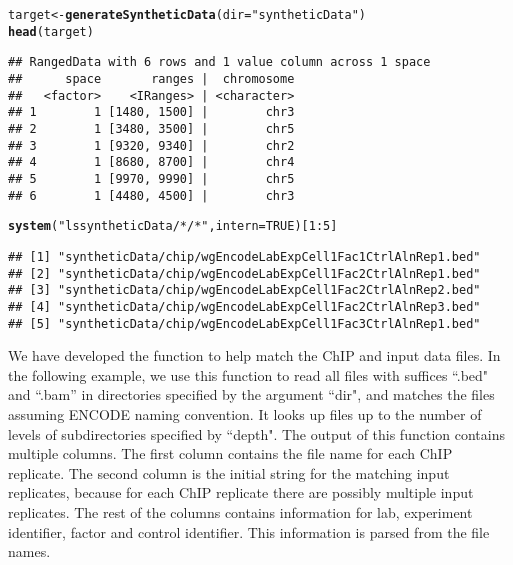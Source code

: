 \documentclass[a4paper,10pt]{article}\usepackage[]{graphicx}\usepackage[]{color}
\makeatletter
\newcommand{\hlnum}[1]{\textcolor[rgb]{0.686,0.059,0.569}{#1}}%
\newcommand{\hlstr}[1]{\textcolor[rgb]{0.192,0.494,0.8}{#1}}%
\newcommand{\hlopt}[1]{\textcolor[rgb]{0,0,0}{#1}}%
\newcommand{\hlstd}[1]{\textcolor[rgb]{0.345,0.345,0.345}{#1}}%
\newcommand{\hlkwb}[1]{\textcolor[rgb]{0.69,0.353,0.396}{#1}}%
\newcommand{\hlkwc}[1]{\textcolor[rgb]{0.333,0.667,0.333}{#1}}%
\newcommand{\hlkwd}[1]{\textcolor[rgb]{0.737,0.353,0.396}{\textbf{#1}}}%
\newenvironment{kframe}{%
 \def\at@end@of@kframe{}%
 \ifinner\ifhmode%
  \def\at@end@of@kframe{\end{minipage}}%
  \begin{minipage}{\columnwidth}%
 \fi\fi%
 \def\FrameCommand##1{\hskip\@totalleftmargin \hskip-\fboxsep
 \colorbox{shadecolor}{##1}\hskip-\fboxsep
     \hskip-\linewidth \hskip-\@totalleftmargin \hskip\columnwidth}%
 \MakeFramed {\advance\hsize-\width
   \@totalleftmargin\z@ \linewidth\hsize
   \@setminipage}}%
 {\par\unskip\endMakeFramed%
 \at@end@of@kframe}
\newenvironment{knitrout}{}{} %
\makeatother
\begin{document}
\begin{knitrout}
\color{fgcolor}\begin{kframe}
\begin{alltt}
\hlstd{target} \hlkwb{<-} \hlkwd{generateSyntheticData}\hlstd{(}\hlkwc{dir} \hlstd{=} \hlstr{"syntheticData"}\hlstd{)}
\hlkwd{head}\hlstd{(target)}
\end{alltt}
\begin{verbatim}
## RangedData with 6 rows and 1 value column across 1 space
##      space       ranges |  chromosome
##   <factor>    <IRanges> | <character>
## 1        1 [1480, 1500] |        chr3
## 2        1 [3480, 3500] |        chr5
## 3        1 [9320, 9340] |        chr2
## 4        1 [8680, 8700] |        chr4
## 5        1 [9970, 9990] |        chr5
## 6        1 [4480, 4500] |        chr3
\end{verbatim}
\begin{alltt}
\hlkwd{system}\hlstd{(}\hlstr{"ls syntheticData/*/*"}\hlstd{,} \hlkwc{intern} \hlstd{=} \hlnum{TRUE}\hlstd{)[}\hlnum{1}\hlopt{:}\hlnum{5}\hlstd{]}
\end{alltt}
\begin{verbatim}
## [1] "syntheticData/chip/wgEncodeLabExpCell1Fac1CtrlAlnRep1.bed"
## [2] "syntheticData/chip/wgEncodeLabExpCell1Fac2CtrlAlnRep1.bed"
## [3] "syntheticData/chip/wgEncodeLabExpCell1Fac2CtrlAlnRep2.bed"
## [4] "syntheticData/chip/wgEncodeLabExpCell1Fac2CtrlAlnRep3.bed"
## [5] "syntheticData/chip/wgEncodeLabExpCell1Fac3CtrlAlnRep1.bed"
\end{verbatim}
\end{kframe}
\end{knitrout}

We have developed the  function to help match the ChIP and input data files. In the following example, we use this function to read all files with suffices ``.bed" and ``.bam'' in directories specified by the argument ``dir", and matches the files assuming ENCODE naming convention. It looks up files up to the number of levels of subdirectories specified by ``depth". The output of this function contains multiple columns. The first column contains the file name for each ChIP replicate. The second column is the initial string for the matching input replicates, because for each ChIP replicate there are possibly multiple input replicates. The rest of the columns contains information for lab, experiment identifier, factor and control identifier. This information is parsed from the file names.
\end{document}
